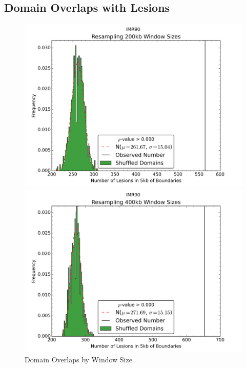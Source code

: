 \newpage
\subsection*{Domain Overlaps with Lesions}

\begin{figure}[H]
  \caption{Domain Overlaps by Window Size}
  \begin{minipage}{0.5\textwidth}%
    \includegraphics[width=\textwidth]{./figures/supplementary/domains/boundaries-IMR90-200kb.png}
  \end{minipage}%
  \hfill
  \begin{minipage}{0.5\textwidth}
    \includegraphics[width=\textwidth]{./figures/supplementary/domains/boundaries-IMR90-400kb.png}
  \end{minipage}%


\end{figure}
